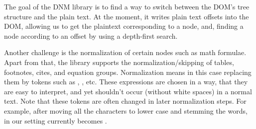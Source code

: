 \documentclass[12pt]{article}
\begin{document}
The goal of the DNM library is to find a way to switch between the DOM's tree structure and the plain text.
At the moment, it writes plain text offsets into the DOM, allowing us to get the plaintext corresponding to a node,
and, finding a node according to an offset by using a depth-first search.

Another challenge is the normalization of certain nodes such as math formulae.
Apart from that, the library supports the normalization/skipping of tables, footnotes, cites, and equation groups.
Normalization means in this case replacing them by tokens such as , , etc.
These expressions are chosen in a way, that they are easy to interpret, and yet shouldn't occur (without white spaces)
in a normal text.
Note that these tokens are often changed in later normalization steps.
For example, after moving all the characters to lower case and stemming the words,
in our setting  currently becomes .
\end{document}
